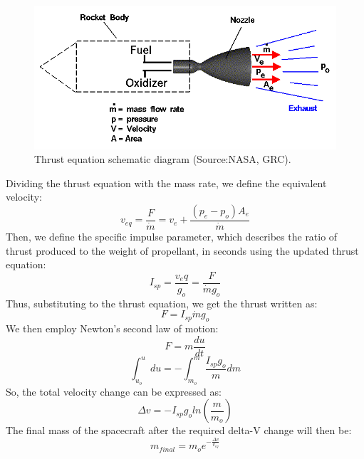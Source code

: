 \begin{figure}[htb]
\centering
\includegraphics[scale=0.6]{figures/Orbiter/rockth.png}
\caption{Thrust equation schematic diagram (Source:NASA, GRC).\cite{rocketeq}}
\label{fig:rocketim}
\end{figure}

Dividing the thrust equation with the mass rate, we define the equivalent velocity:
\begin{equation}
v_{eq}=\frac{F}{\dot{m}}=v_e+\frac{(p_e-p_o) A_e}{\dot{m}}
\end{equation}
Then, we define the specific impulse parameter, which describes the ratio of thrust produced to the weight of propellant, in seconds using the updated thrust equation:
\begin{equation}
I_{sp}=\frac{v_eq}{g_o} =\frac{F}{\dot{m}g_o}
\end{equation}
Thus, substituting to the thrust equation, we get the thrust written as:
\begin{equation}
F=I_{sp}\dot{m}g_o
\end{equation}
We then employ Newton’s second law of motion:
\begin{equation}
F=m\frac{du}{dt}
\end{equation}
\begin{equation}
\int_{u_o}^{u}du=-\int_{m_o}^{m}\frac{I_{sp}g_o}{m}dm
\end{equation}
So, the total velocity change can be expressed as:
\begin{equation}
\Delta v=-I_{sp}g_o ln(\frac{m}{m_o})
\end{equation}
The final mass of the spacecraft after the required delta-V change will then be:
\begin{equation}
m_{final}=m_{o}e^{-\frac{\Delta v}{v_{eq}}}
\end{equation}
